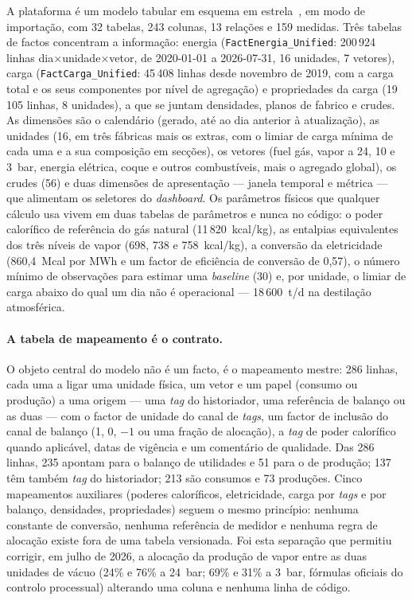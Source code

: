 

A plataforma é um modelo tabular em esquema em estrela~\cite{KimballRoss2013}, em modo de
importação, com 32 tabelas, 243 colunas, 13 relações e 159 medidas.
Três tabelas de factos concentram a informação: energia
(\texttt{FactEnergia\_Unified}: 200\,924 linhas dia$\times$unidade$\times$vetor,
de 2020-01-01 a 2026-07-31, 16 unidades, 7 vetores), carga
(\texttt{FactCarga\_Unified}: 45\,408 linhas desde novembro de 2019, com a
carga total e os seus componentes por nível de agregação) e propriedades
da carga (19\,105 linhas, 8 unidades), a que se juntam densidades, planos
de fabrico e crudes. As dimensões são o calendário (gerado, até ao dia
anterior à atualização), as unidades (16, em três fábricas mais os
extras, com o limiar de carga mínima de cada uma e a sua composição em
secções), os vetores (fuel gás, vapor a 24, 10 e 3~bar, energia
elétrica, coque e outros combustíveis, mais o agregado global), os crudes
(56) e duas dimensões de apresentação --- janela temporal e métrica ---
que alimentam os seletores do \emph{dashboard}. Os parâmetros físicos que
qualquer cálculo usa vivem em duas tabelas de parâmetros e nunca no
código: o poder calorífico de referência do gás natural
(11\,820~kcal/kg), as entalpias equivalentes dos três níveis de vapor
(698, 738 e 758~kcal/kg), a conversão da eletricidade (860,4~Mcal por MWh e um
factor de eficiência de conversão de 0,57), o número mínimo de
observações para estimar uma \emph{baseline} (30) e, por unidade, o limiar
de carga abaixo do qual um dia não é operacional --- 18\,600~t/d na
destilação atmosférica.

\paragraph{A tabela de mapeamento é o contrato.} O objeto central do
modelo não é um facto, é o mapeamento mestre: 286 linhas, cada uma a
ligar uma unidade física, um vetor e um papel (consumo ou produção) a
uma origem --- uma \emph{tag} do historiador, uma referência de balanço
ou as duas --- com o factor de unidade do canal de \emph{tags}, um factor
de inclusão do canal de balanço (1, 0, $-1$ ou uma fração de alocação),
a \emph{tag} de poder calorífico quando aplicável, datas de vigência e um
comentário de qualidade. Das 286 linhas, 235 apontam para o balanço de
utilidades e 51 para o de produção; 137 têm também \emph{tag} do
historiador; 213 são consumos e 73 produções. Cinco mapeamentos auxiliares
(poderes caloríficos, eletricidade, carga por \emph{tags} e por balanço,
densidades, propriedades) seguem o mesmo princípio: nenhuma constante de
conversão, nenhuma referência de medidor e nenhuma regra de alocação
existe fora de uma tabela versionada. Foi esta separação que permitiu
corrigir, em julho de 2026, a alocação da produção de vapor entre as duas
unidades de vácuo (24\% e 76\% a 24~bar; 69\% e 31\% a 3~bar, fórmulas
oficiais do controlo processual) alterando uma coluna e nenhuma linha de
código.

